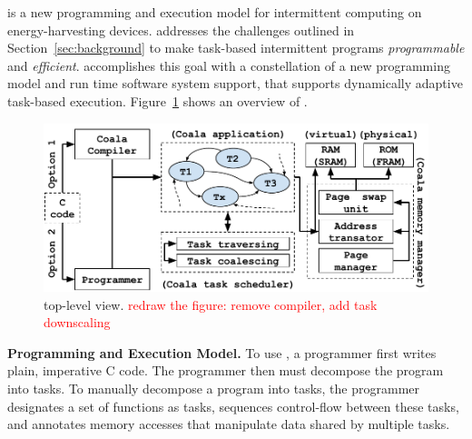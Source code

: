 \sys is a new programming and execution model for intermittent computing on energy-harvesting devices. \sys addresses the challenges outlined in Section~\ref{sec:background} to make task-based intermittent programs {\em programmable} and {\em efficient}. \sys accomplishes this goal with a constellation of a new programming model and run time software system support, that supports dynamically adaptive task-based execution. Figure~\ref{fig:system_overview} shows an overview of \sys.

\begin{figure}
	\centering
	\includegraphics[width=\columnwidth]{figures/viper_block_diagram.pdf}
	\caption{\sys top-level view. \textcolor{red}{redraw the figure: remove compiler, add task downscaling}}
	\label{fig:system_overview}
\end{figure}

\textbf{\sys Programming and Execution Model.}  To use \sys, a programmer first writes plain, imperative C code. The programmer
then must decompose the program into tasks. To manually decompose a program into tasks, the programmer designates a set of functions as tasks, sequences control-flow between these tasks, and annotates memory accesses that manipulate data shared by multiple tasks. 

%
%
%

